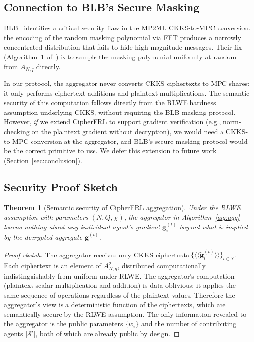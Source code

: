 \documentclass[letterpaper,journal]{IEEEtran}
\newtheorem{theorem}{Theorem}
\newcommand{\ct}[1]{\langle\!\langle #1 \rangle\!\rangle}
\begin{document}
\subsection{Connection to BLB's Secure Masking}

BLB~\cite{blb2025} identifies a critical security flaw in the MP2ML
CKKS-to-MPC conversion: the encoding of the random masking polynomial via FFT
produces a narrowly concentrated distribution that fails to hide high-magnitude
messages.
Their fix (Algorithm~1 of~\cite{blb2025}) is to sample the masking polynomial
uniformly at random from $A_{N,q}$ directly.

In our protocol, the aggregator never converts CKKS ciphertexts to MPC shares;
it only performs ciphertext additions and plaintext multiplications.
The semantic security of this computation follows directly from the RLWE
hardness assumption underlying CKKS, without requiring the BLB masking protocol.
However, \emph{if} we extend CipherFRL to support gradient verification
(e.g., norm-checking on the plaintext gradient without decryption), we would
need a CKKS-to-MPC conversion at the aggregator, and BLB's secure masking
protocol would be the correct primitive to use.
We defer this extension to future work (Section~\ref{sec:conclusion}).

\subsection{Security Proof Sketch}

\begin{theorem}[Semantic security of CipherFRL aggregation]
Under the RLWE assumption with parameters $(N, Q, \chi)$, the aggregator
in Algorithm~\ref{alg:agg} learns nothing about any individual agent's
gradient $\mathbf{g}_i^{(t)}$ beyond what is implied by the decrypted
aggregate $\bar{\mathbf{g}}^{(t)}$.
\end{theorem}

\begin{proof}[Proof sketch]
The aggregator receives only CKKS ciphertexts
$\{\ct{\tilde{\mathbf{g}}_i^{(t)}}\}_{i \in \mathcal{S}}$.
Each ciphertext is an element of $A_{N,q}^2$, distributed computationally
indistinguishably from uniform under RLWE.
The aggregator's computation (plaintext scalar multiplication and addition)
is data-oblivious: it applies the same sequence of operations regardless
of the plaintext values.
Therefore the aggregator's view is a deterministic function of the ciphertexts,
which are semantically secure by the RLWE assumption.
The only information revealed to the aggregator is the public parameters
$\{w_i\}$ and the number of contributing agents $|\mathcal{S}'|$, both of
which are already public by design.
\end{proof}
\end{document}
